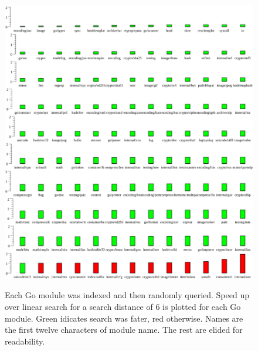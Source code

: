 \begin{figure}
    \includegraphics[width=\textwidth]{example6.png}
    \label{dist6plot}
    \centering
    \caption{Each Go module was indexed and then randomly queried.
    Speed up over linear search for a search distance of $6$ is plotted for each Go module.
    Green idicates search was fater, red otherwise.
    Names are the first twelve characters of module name.
    The rest are elided for readability.}
\end{figure}